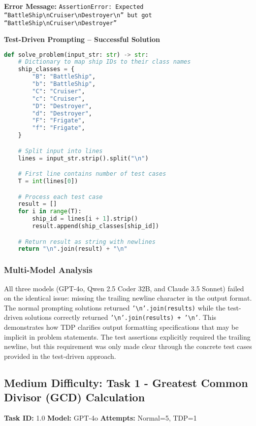 \documentclass{article}
\begin{document}
\textbf{Error Message:}
\texttt{AssertionError: Expected ``BattleShip\textbackslash nCruiser\textbackslash nDestroyer\textbackslash n'' but got ``BattleShip\textbackslash nCruiser\textbackslash nDestroyer''}

\textbf{Test-Driven Prompting -- Successful Solution}
\begin{lstlisting}[language=python]
def solve_problem(input_str: str) -> str:
    # Dictionary to map ship IDs to their class names
    ship_classes = {
        "B": "BattleShip",
        "b": "BattleShip",
        "C": "Cruiser",
        "c": "Cruiser",
        "D": "Destroyer",
        "d": "Destroyer",
        "F": "Frigate",
        "f": "Frigate",
    }

    # Split input into lines
    lines = input_str.strip().split("\n")

    # First line contains number of test cases
    T = int(lines[0])

    # Process each test case
    result = []
    for i in range(T):
        ship_id = lines[i + 1].strip()
        result.append(ship_classes[ship_id])

    # Return result as string with newlines
    return "\n".join(result) + "\n"
\end{lstlisting}

\subsubsection{Multi-Model Analysis}

All three models (GPT-4o, Qwen 2.5 Coder 32B, and Claude 3.5 Sonnet) failed on the identical issue: missing the trailing newline character in the output format. The normal prompting solutions returned \texttt{'\textbackslash n'.join(results)} while the test-driven solutions correctly returned \texttt{'\textbackslash n'.join(results) + '\textbackslash n'}. This demonstrates how TDP clarifies output formatting specifications that may be implicit in problem statements. The test assertions explicitly required the trailing newline, but this requirement was only made clear through the concrete test cases provided in the test-driven approach.

\subsection{Medium Difficulty: Task 1 - Greatest Common Divisor (GCD) Calculation}
\label{appendix:task1}

\noindent \textbf{Task ID:} 1.0 \quad \textbf{Model:} GPT-4o \quad \textbf{Attempts:} Normal=5, TDP=1
\end{document}
